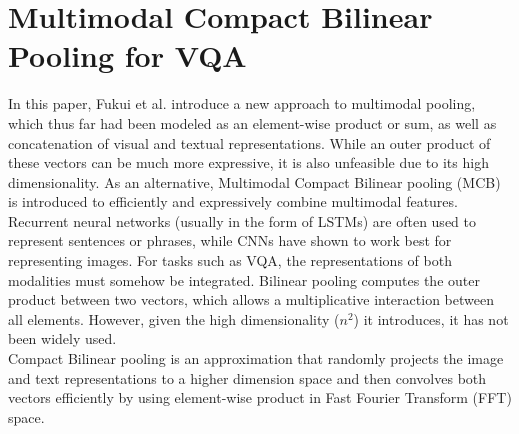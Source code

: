 \documentclass{article}
\begin{document}
\section{Multimodal Compact Bilinear Pooling for VQA}
In this paper, Fukui et al. \citep{corrFukui16} introduce a new approach to multimodal pooling, which thus far had been modeled as an element-wise product or sum, as well as concatenation of visual and textual representations. While an outer product of these vectors can be much more expressive, it is also unfeasible due to its high dimensionality. As an alternative, Multimodal Compact Bilinear pooling (MCB) is introduced to efficiently and expressively combine multimodal features.\\
Recurrent neural networks (usually in the form of LSTMs) are often used to represent sentences or phrases, while CNNs have shown to work best for representing images. For tasks such as VQA, the representations of both modalities must somehow be integrated. Bilinear pooling computes the outer product between two vectors, which allows a multiplicative interaction between all elements. However, given the high dimensionality ($n^2$) it introduces, it has not been widely used.\\
Compact Bilinear pooling is an approximation that randomly projects the image and text representations to a higher dimension space and then convolves both vectors efficiently by using element-wise product in Fast Fourier Transform (FFT) space.
\end{document}
